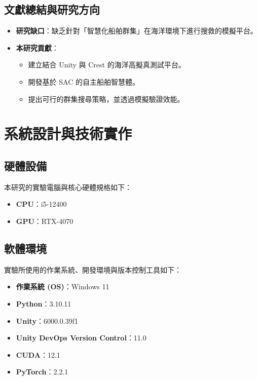 \documentclass[12pt,a4paper]{article}
\begin{document}
\subsection{文獻總結與研究方向}

\begin{itemize}
  \item \textbf{研究缺口}：缺乏針對「智慧化船舶群集」在海洋環境下進行搜救的模擬平台。
  \item \textbf{本研究貢獻}：
  \begin{itemize}
    \item 建立結合 Unity 與 Crest 的海洋高擬真測試平台。
    \item 開發基於 SAC 的自主船舶智慧體。
    \item 提出可行的群集搜尋策略，並透過模擬驗證效能。
  \end{itemize}
\end{itemize}

\newpage

\section{系統設計與技術實作}

\subsection{硬體設備}
本研究的實驗電腦與核心硬體規格如下：
\begin{itemize}
	\item \textbf{CPU}：i5-12400
  	\item \textbf{GPU}：RTX-4070
\end{itemize}

\subsection{軟體環境}
實驗所使用的作業系統、開發環境與版本控制工具如下：
\begin{itemize}
    \item \textbf{作業系統 (OS)}：Windows 11
    \item \textbf{Python}：3.10.11
    \item \textbf{Unity}：6000.0.39f1
    \item \textbf{Unity DevOps Version Control}：11.0
    \item \textbf{CUDA}：12.1
    \item \textbf{PyTorch}：2.2.1
\end{itemize}
\end{document}

